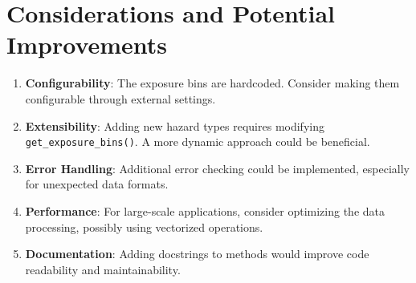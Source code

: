\documentclass{article}
\begin{document}
\section{Considerations and Potential Improvements}

\begin{enumerate}
    \item \textbf{Configurability}: The exposure bins are hardcoded. Consider making them configurable through external settings.

    \item \textbf{Extensibility}: Adding new hazard types requires modifying \texttt{get\_exposure\_bins()}. A more dynamic approach could be beneficial.

    \item \textbf{Error Handling}: Additional error checking could be implemented, especially for unexpected data formats.

    \item \textbf{Performance}: For large-scale applications, consider optimizing the data processing, possibly using vectorized operations.

    \item \textbf{Documentation}: Adding docstrings to methods would improve code readability and maintainability.
\end{enumerate}
\end{document}
